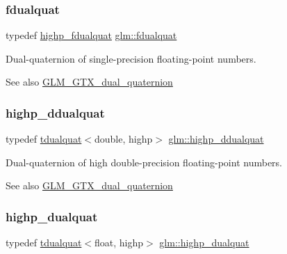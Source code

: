 \subsubsection{\texorpdfstring{fdualquat}{fdualquat}}
{\footnotesize\ttfamily typedef \hyperlink{group__gtx__dual__quaternion_ga8c46d61c38b2b6d9c5091c667dd20fe8}{highp\+\_\+fdualquat} \hyperlink{group__gtx__dual__quaternion_ga436906129bc69ca5059555cafcbac9fd}{glm\+::fdualquat}}

Dual-\/quaternion of single-\/precision floating-\/point numbers.

\begin{DoxySeeAlso}{See also}
\hyperlink{group__gtx__dual__quaternion}{G\+L\+M\+\_\+\+G\+T\+X\+\_\+dual\+\_\+quaternion} 
\end{DoxySeeAlso}
\mbox{\label{group__gtx__dual__quaternion_ga83e4c5d27c8b0a264a3f3aed24f3f84e}} 
\subsubsection{\texorpdfstring{highp\+\_\+ddualquat}{highp\_ddualquat}}
{\footnotesize\ttfamily typedef \hyperlink{structglm_1_1tdualquat}{tdualquat}$<$double, highp$>$ \hyperlink{group__gtx__dual__quaternion_ga83e4c5d27c8b0a264a3f3aed24f3f84e}{glm\+::highp\+\_\+ddualquat}}

Dual-\/quaternion of high double-\/precision floating-\/point numbers.

\begin{DoxySeeAlso}{See also}
\hyperlink{group__gtx__dual__quaternion}{G\+L\+M\+\_\+\+G\+T\+X\+\_\+dual\+\_\+quaternion} 
\end{DoxySeeAlso}
\mbox{\label{group__gtx__dual__quaternion_ga98557c3577757f2ced8f35b1de7fa234}} 
\subsubsection{\texorpdfstring{highp\+\_\+dualquat}{highp\_dualquat}}
{\footnotesize\ttfamily typedef \hyperlink{structglm_1_1tdualquat}{tdualquat}$<$float, highp$>$ \hyperlink{group__gtx__dual__quaternion_ga98557c3577757f2ced8f35b1de7fa234}{glm\+::highp\+\_\+dualquat}}

